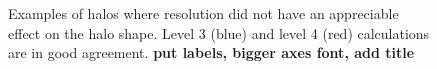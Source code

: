 \begin{figure}[!ht]
  \centering
  \hfill
  \caption{Examples of halos where resolution did not have an appreciable effect on the halo shape. Level 3 (blue) and level 4 (red) calculations are in good agreement. \textbf{put labels, bigger axes font, add title} }
\end{figure}



